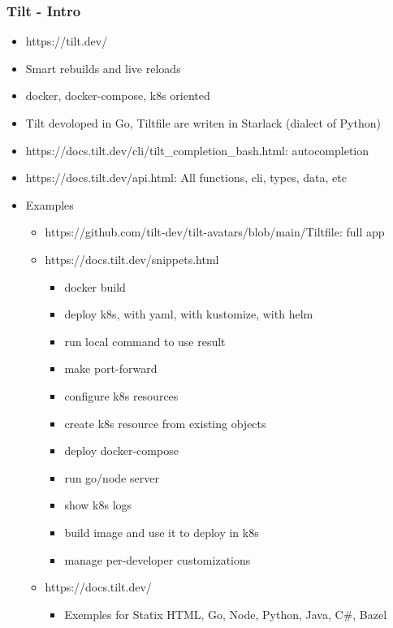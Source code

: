 \subsubsection{Tilt - Intro}
\begin{frame}[fragile]{\subsubsecname}
  \begin{itemize}
    \item https://tilt.dev/
    \item Smart rebuilds and live reloads
    \item docker, docker-compose, k8s oriented
    \item Tilt devoloped in Go, Tiltfile are writen in Starlack (dialect of Python)
    \item https://docs.tilt.dev/cli/tilt\_completion\_bash.html: autocompletion
    \item https://docs.tilt.dev/api.html: All functions, cli, types, data, etc
    \item Examples
    \begin{itemize}
      \item https://github.com/tilt-dev/tilt-avatars/blob/main/Tiltfile: full app
      \item https://docs.tilt.dev/snippets.html
      \begin{itemize}
        \item docker build
        \item deploy k8s, with yaml, with kustomize, with helm
        \item run local command to use result
        \item make port-forward
        \item configure k8s resources
        \item create k8s resource from existing objects
        \item deploy docker-compose
        \item run go/node server
        \item show k8s logs
        \item build image and use it to deploy in k8s
        \item manage per-developer customizations
      \end{itemize}
      \item https://docs.tilt.dev/
      \begin{itemize}
        \item Exemples for Statix HTML, Go, Node, Python, Java, C\#, Bazel
      \end{itemize}
    \end{itemize}
\end{itemize}
\end{frame}
